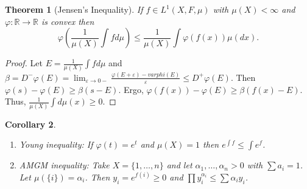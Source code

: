 \documentclass{article}
\newtheorem{theorem}{Theorem}[section]
\newtheorem{corollary}[theorem]{Corollary}
\theoremstyle{definition}
\begin{document}
\begin{theorem}[Jensen's Inequality]
If \(f\in L^1(X,F,\mu)\) with \(\mu(X)<\infty \) and \(\varphi:\mathbb{R}\rightarrow\mathbb{R} \) is convex then
    \[
        \varphi\left(\frac{1}{\mu(X)}\int fd\mu\right)\leq \frac{1}{\mu(X)}\int \varphi(f(x))\mu(dx).
    \]
\end{theorem}
\begin{proof}
    Let \(E=\frac{1}{\mu(X)}\int fd\mu \) and
    \(\beta=D^-\varphi(E)=\lim_{\varepsilon\to 0-}\frac{\varphi(E+\varepsilon)-varphi(E)}{\varepsilon}\leq D^+\varphi(E)\).
    Then \(\varphi(s)-\varphi(E)\geq \beta(s-E)\). Ergo, \(\varphi(f(x))-\varphi(E)\geq\beta(f(x)-E)\). Thus,
    \(\frac{1}{\mu(X)}\int d\mu(x)\geq 0\).
\end{proof}

\begin{corollary}
    \begin{enumerate}
        \item Young inequality: If \(\varphi(t)=e^t\) and \(\mu(X)=1\) then \(e^{\int f}\leq \int e^f\).
        \item AMGM inequality: Take \(X=\{1,\ldots, n\} \) and let \(\alpha_1,\ldots,\alpha_n>0\) with \(\sum a_i=1\).
        Let \(\mu(\{i\})=\alpha_i\). Then \(y_i=e^{f(i)}\geq 0\) and \(\prod y_i^{\alpha_i} \leq \sum \alpha_i y_i\).
    \end{enumerate}
\end{corollary}









\end{document}
